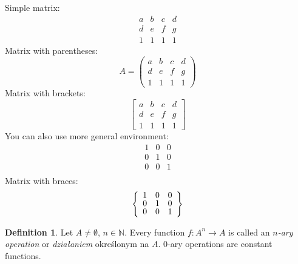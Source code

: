 \documentclass[a4paper,11pt,twoside]{report}
\theoremstyle{definition}
\newtheorem{definition}[theorem]{Definition}
\begin{document}
Simple matrix:
\begin{equation*}
    \begin{matrix}
        a & b & c & d \\
        d & e & f & g \\
        1 & 1 & 1 & 1
    \end{matrix}
\end{equation*}
%
Matrix with parentheses:
%
\begin{equation*}
    A =
    \begin{pmatrix}
        a & b & c & d \\
        d & e & f & g \\
        1 & 1 & 1 & 1
    \end{pmatrix}
\end{equation*}
%
Matrix with brackets:
%
\begin{equation*}
    \begin{bmatrix}
        a & b & c & d \\
        d & e & f & g \\
        1 & 1 & 1 & 1
    \end{bmatrix}
\end{equation*}
%
You can also use more general environment:
%
\begin{equation*}
    \renewcommand{\arraystretch}{0.8}
    \begin{array}{ccc}
        1 & 0 & 0 \\
        0 & 1 & 0 \\
        0 & 0 & 1 \\
    \end{array}
\end{equation*}
%
Matrix with braces:
%
\begin{equation*}
    \left\{
    \renewcommand{\arraystretch}{0.8}
    \begin{array}{ccc}
        1 & 0 & 0 \\
        0 & 1 & 0 \\
        0 & 0 & 1 \\
    \end{array}\right\}
\end{equation*}

\begin{definition}
    Let $A\neq \emptyset$, $n \in \mathbb{N}$. Every function $f\colon A^n \to A$ is called an \emph{$n$-ary operation} or \emph{działaniem} określonym na $A$.
    $0$-ary operations are constant functions.
\end{definition}
\end{document}
